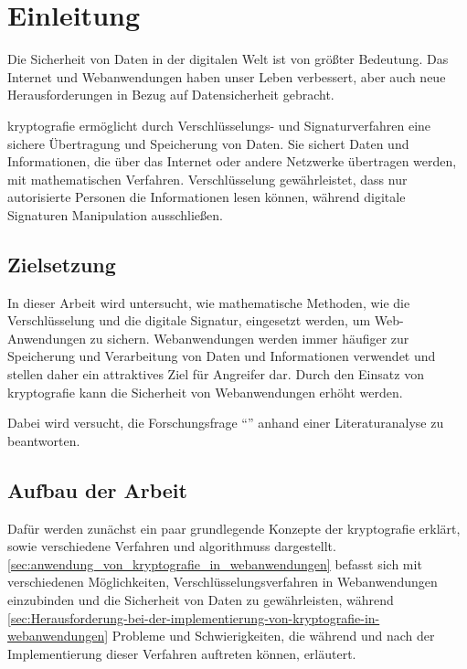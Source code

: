 \section{Einleitung}\label{sec:einleitung}
Die Sicherheit von Daten in der digitalen Welt ist von größter Bedeutung. 
Das Internet und Webanwendungen haben unser Leben verbessert, aber auch neue Herausforderungen in Bezug auf Datensicherheit gebracht.

\Gls{kryptografie} ermöglicht durch Verschlüsselungs- und Signaturverfahren eine sichere Übertragung und Speicherung von Daten.
Sie sichert Daten und Informationen, die über das Internet oder andere Netzwerke übertragen werden, mit mathematischen Verfahren. 
Verschlüsselung gewährleistet, dass nur autorisierte Personen die Informationen lesen können, während digitale Signaturen Manipulation ausschließen.


\subsection{Zielsetzung}\label{subsec:zielsetzung}
In dieser Arbeit wird untersucht, wie mathematische Methoden, wie die Verschlüsselung und die digitale Signatur, eingesetzt werden, um Web-Anwendungen zu sichern.
Webanwendungen werden immer häufiger zur Speicherung und Verarbeitung von Daten und Informationen verwendet und stellen daher ein attraktives Ziel für Angreifer dar.
Durch den Einsatz von \gls{kryptografie} kann die Sicherheit von Webanwendungen erhöht werden.

Dabei wird versucht, die Forschungsfrage \enquote{\myForschungsfrage} anhand einer Literaturanalyse zu beantworten.


\subsection{Aufbau der Arbeit}\label{subsec:aufbau-der-arbeit}
Dafür werden zunächst ein paar grundlegende Konzepte der \gls{kryptografie} erklärt, sowie verschiedene  Verfahren und \glspl{algorithmus} dargestellt.
\autoref{sec:anwendung_von_kryptografie_in_webanwendungen} befasst sich mit verschiedenen Möglichkeiten, Verschlüsselungsverfahren in Webanwendungen einzubinden und die Sicherheit von Daten zu gewährleisten, während  \autoref{sec:Herausforderung-bei-der-implementierung-von-kryptografie-in-webanwendungen} Probleme und Schwierigkeiten, die während und nach der Implementierung dieser Verfahren auftreten können, erläutert.